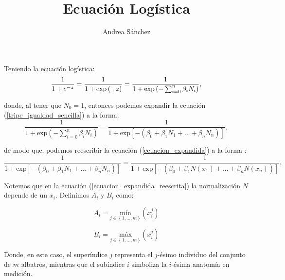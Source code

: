 \documentclass{article}
\begin{document}
\title{Ecuación Logística}
\author{Andrea Sánchez}
\maketitle
\begin{flushleft}

Teniendo la ecuación logística:
\begin{equation}
    \label{tripe_igualdad_sencilla}
    \frac{1}{1+e^{-z}} = \frac{1}{1+\mbox{\mbox{exp}}\left ( -z\right )} = \frac{1}{1+\mbox{\mbox{exp}}\left (-\sum_{i=0}^{n} \beta _{i}N_{i} \right )} ,
\end{equation}

donde, al tener que $N_{0}=1$, entonces podemos expandir la ecuación (\ref{tripe_igualdad_sencilla}) a la forma:
\begin{equation}
    \label{ecuacion_expandida}
    \frac{1}{1+\mbox{exp}\left (-\sum_{i=0}^{n} \beta _{i}N_{i} \right )} = \frac{1}{1+\mbox{exp}\left [ -\left ( \beta _{0} + \beta _{1}N_{1}+...+\beta_{n}N_{n} \right ) \right ]} ,
\end{equation}

de modo que, podemos reescribir la ecuación (\ref{ecuacion_expandida}) a la forma :
\begin{equation}
    \label{ecuacion_expandida_reescrita}    
    \frac{1}{1+\mbox{exp}\left [ -\left ( \beta _{0} + \beta _{1}N_{1}+...+\beta_{n}N_{n} \right ) \right ]} = \frac{1}{1+\mbox{exp}\left [ -\left ( \beta _{0} + \beta _{1}N(x_{1})+...+\beta_{n}N(x_{n})\right ) \right ]} .
\end{equation}

Notemos que en la ecuación (\ref{ecuacion_expandida_reescrita}) la normalización $N$ depende de un $x_{i}$. Definimos $A_{i}$ y $B_{i}$ como:

\begin{equation}
    \label{maximos_A}
    A_{i}= \underset{j\in \left \{ 1,...,m \right \}}{\mbox{mín}}\left ( x_{i}^{j} \right )
\end{equation}

\begin{equation}
    \label{minimos_B}
    B_{i}= \underset{j\in \left \{ 1,...,m \right \}}{\mbox{máx}}\left ( x_{i}^{j} \right )
\end{equation}

Donde, en este caso, el superíndice $j$ representa el $j$-ésimo individuo del conjunto de $m$ albatros, mientras que el subíndice $i$ simboliza la $i$-ésima anatomía en medición.


\end{flushleft}
\end{document}
